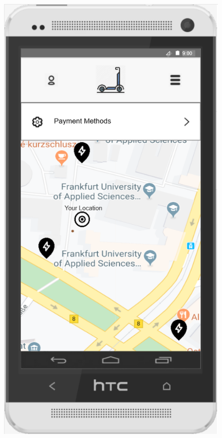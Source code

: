 \documentclass[a4paper, 12pt]{article}
\begin{document}
\begin{figure} [htbp]
    \begin{center}
        \begin{minipage}{0.45\textwidth}
            \begin{center}
                \includegraphics[scale=0.65]{images/prototypes/02-02-menu-dropdown--payment-information.png}

\end{center}
\end{minipage}
\end{center}
\end{figure}
\end{document}
